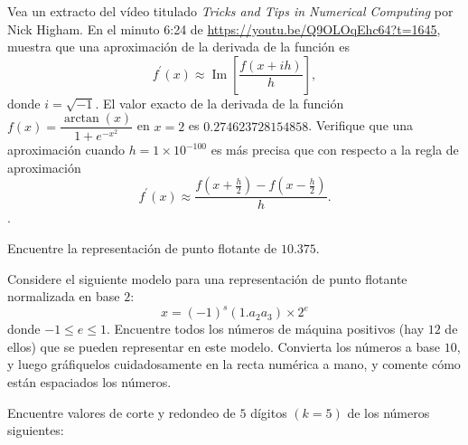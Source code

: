 \begin{questions}
    \question

    Vea un extracto del vídeo titulado
    \emph{Tricks and Tips in Numerical Computing} por Nick Higham.
    En el minuto 6:24 de \url{https://youtu.be/Q9OLOqEhc64?t=1645},
    muestra que una aproximación de la derivada de la función es
    \begin{equation*}
        f^{\prime}\left(x\right)\approx
        \operatorname{Im}
        \left[
            \frac{f\left(x+ih\right)}{h}
            \right],
    \end{equation*}
    donde $i=\sqrt{-1}$.
    El valor exacto de la derivada de la función
    \begin{math}
        f\left(x\right)=
        \dfrac{\arctan\left(x\right)}{1+e^{-x^{2}}}
    \end{math}
    en $x=2$ es $0.274623728154858$.
    Verifique que una aproximación cuando $h=1\times 10^{-100}$ es
    más precisa que con respecto a la regla de aproximación
    \begin{equation*}
        f^{\prime}\left(x\right)\approx
        \frac{
            f\left(x+\frac{h}{2}\right)-
            f\left(x-\frac{h}{2}\right)
        }{h}.
    \end{equation*}.

    \question

    Encuentre la representación de punto flotante de $10.375$.

    \question

    Considere el siguiente modelo para una representación de punto
    flotante normalizada en base $2$:
    \begin{equation*}
        x=\left(-1\right)^{s}
        \left(1.a_{2}a_{3}\right)
        \times 2^{e}
    \end{equation*}
    donde $-1\leq e\leq 1$.
    Encuentre todos los números de máquina positivos (hay $12$ de
    ellos) que se pueden representar en este modelo.
    Convierta los números a base $10$, y luego gráfiquelos
    cuidadosamente en la recta numérica a mano, y comente cómo están
    espaciados los números.

    \question

    Encuentre valores de corte y redondeo de $5$ dígitos
    $\left(k=5\right)$ de los números siguientes:

    \begin{multicols}{2}


\end{multicols}
\end{questions}
